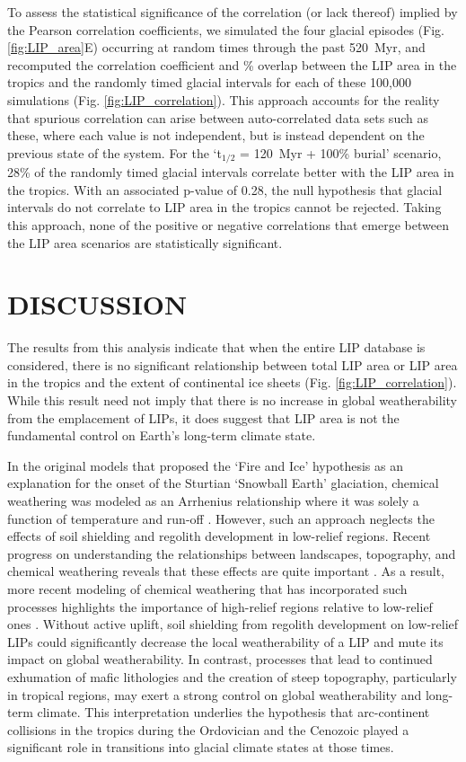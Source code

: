 \documentclass[11pt,letterpaper]{article}
\begin{document}
To assess the statistical significance of the correlation (or lack thereof) implied by the Pearson correlation coefficients, we simulated the four glacial episodes (Fig. \ref{fig:LIP_area}E) occurring at random times through the past 520~Myr, and recomputed the correlation coefficient and \% overlap between the LIP area in the tropics and the randomly timed glacial intervals for each of these 100,000 simulations (Fig. \ref{fig:LIP_correlation}). This approach accounts for the reality that spurious correlation can arise between auto-correlated data sets such as these, where each value is not independent, but is instead dependent on the previous state of the system. For the `t$_{1/2}$ = 120~Myr + 100\% burial' scenario, 28\% of the randomly timed glacial intervals correlate better with the LIP area in the tropics. With an associated p-value of 0.28, the null hypothesis that glacial intervals do not correlate to LIP area in the tropics cannot be rejected. Taking this approach, none of the positive or negative correlations that emerge between the LIP area scenarios are statistically significant.

\section*{DISCUSSION}

The results from this analysis indicate that when the entire LIP database is considered, there is no significant relationship between total LIP area or LIP area in the tropics and the extent of continental ice sheets (Fig. \ref{fig:LIP_correlation}). While this result need not imply that there is no increase in global weatherability from the emplacement of LIPs, it does suggest that LIP area is not the fundamental control on Earth's long-term climate state.

In the original models that proposed the `Fire and Ice' hypothesis as an explanation for the onset of the Sturtian `Snowball Earth' glaciation, chemical weathering was modeled as an Arrhenius relationship where it was solely a function of temperature and run-off \citep{Donnadieu2004a}. However, such an approach neglects the effects of soil shielding and regolith development in low-relief regions. Recent progress on understanding the relationships between landscapes, topography, and chemical weathering reveals that these effects are quite important \citep{Gabet2009a, Maher2014a}. As a result, more recent modeling of chemical weathering that has incorporated such processes highlights the importance of high-relief regions relative to low-relief ones \citep{Godderis2017b}. Without active uplift, soil shielding from regolith development on low-relief LIPs could significantly decrease the local weatherability of a LIP and mute its impact on global weatherability. In contrast, processes that lead to continued exhumation of mafic lithologies and the creation of steep topography, particularly in tropical regions, may exert a strong control on global weatherability and long-term climate. This interpretation underlies the hypothesis that arc-continent collisions in the tropics during the Ordovician \citep{Swanson-Hysell2017a} and the Cenozoic \citep{Jagoutz2016a} played a significant role in transitions into glacial climate states at those times.
\end{document}
